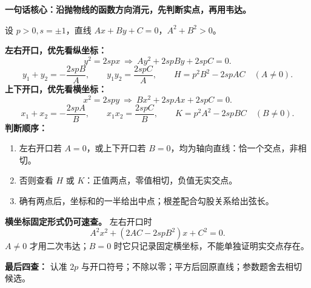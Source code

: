 \begin{summarybox}
\textbf{一句话核心：沿抛物线的函数方向消元，先判断实点，再用韦达。}

设 $p>0,s=\pm1$，直线 $Ax+By+C=0$，$A^2+B^2>0$。

\textbf{左右开口，优先看纵坐标：}
\[
 y^2=2spx\ \Longrightarrow\ Ay^2+2spBy+2spC=0.
\]
\[
 y_1+y_2=-\frac{2spB}{A},\qquad y_1y_2=\frac{2spC}{A},\qquad
 H=p^2B^2-2spAC\quad(A\ne0).
\]
\textbf{上下开口，优先看横坐标：}
\[
 x^2=2spy\ \Longrightarrow\ Bx^2+2spAx+2spC=0.
\]
\[
 x_1+x_2=-\frac{2spA}{B},\qquad x_1x_2=\frac{2spC}{B},\qquad
 K=p^2A^2-2spBC\quad(B\ne0).
\]
\textbf{判断顺序：}
\begin{enumerate}[leftmargin=*,itemsep=.4em]
 \item 左右开口若 $A=0$，或上下开口若 $B=0$，均为轴向直线：恰一个交点，非相切。
 \item 否则查看 $H$ 或 $K$：正值两点，零值相切，负值无实交点。
 \item 确有两点后，坐标和的一半给出中点；根差配合勾股关系给出弦长。
\end{enumerate}
\textbf{横坐标固定形式仍可速查。} 左右开口时
\[
 A^2x^2+(2AC-2spB^2)x+C^2=0.
\]
$A\ne0$ 才用二次韦达；$B=0$ 时它只记录固定横坐标，不能单独证明实交点存在。

\textbf{最后四查：} 认准 $2p$ 与开口符号；不除以零；平方后回原直线；参数题舍去相切候选。
\end{summarybox}
